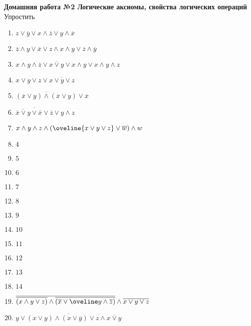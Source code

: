 



    \begin{center}
        \textbf{Домашняя работа №2 Логические аксиомы, свойства логических операций}\\
        Упростить
    \end{center}

    \begin{enumerate}
        \item $z \vee \overline y \vee x \wedge \overline z \vee y \wedge \overline x$
        \item $\overline z \wedge y \vee \overline x \vee z \wedge x \wedge y \vee \overline z \wedge \overline y$
        \item $x \wedge y \wedge \overline z \vee \overline{x \vee y} \vee x \wedge y \vee  x \wedge y \wedge z$
        \item $x \vee y \vee z \vee \overline{x \vee y \vee z}$
        \item $\overline{(\overline x \vee y) \wedge (\overline x \vee y)} \vee \overline x$
        \item $\overline{\overline{\overline x \vee y} \vee \overline x \vee \overline z} \vee y \wedge z$
        \item $x \wedge y \wedge z \wedge (\oveline{x \vee y \vee z} \vee \overline w) \wedge w$
        \item $4$
        \item $5$
        \item $6$
        \item $7$
        \item $8$
        \item $9$
        \item $10$
        \item $11$
        \item $12$
        \item $13$
        \item $14$
        \item $\overline{\overline{(x \wedge y \vee z)} \wedge \overline{(\overline x \vee \oveline y \wedge \overline z)}} \wedge \overline{x \vee y \vee z}$
        \item $\overline{y \vee (x \vee y) \wedge (x \vee \overline y) \vee z \wedge \overline{x \vee y}}$
    \end{enumerate}


